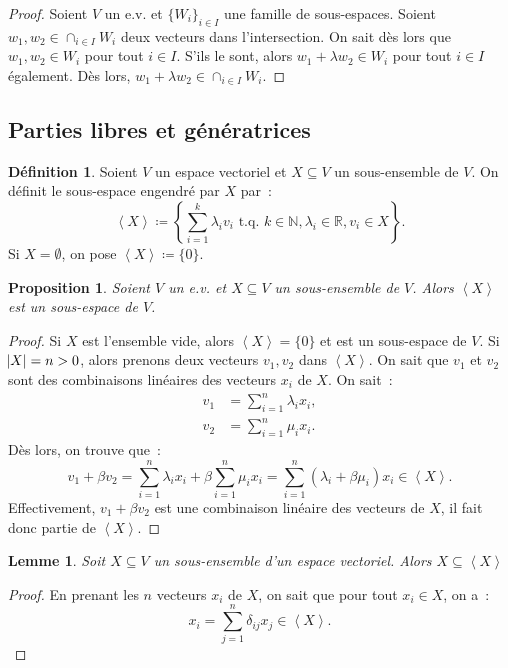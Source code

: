 \documentclass{article}
\newcommand{\N}{\mathbb N}
\newcommand{\R}{\mathbb R}
\newcommand{\eng}[1]{\left\langle#1\right\rangle}
\newcommand{\tq}{\textrm{ t.q. }}
\newtheorem{prp}[thm]{Proposition}
\newtheorem{lem}[thm]{Lemme}
\theoremstyle{definition}
\newtheorem{déf}[thm]{Définition}
\theoremstyle{remark}
\begin{document}
		\begin{proof} Soient $V$ un e.v. et $\{W_i\}_{i \in I}$ une famille de sous-espaces. Soient $w_1, w_2 \in \cap_{i \in I}W_i$ deux vecteurs dans l'intersection.
		On sait dès lors que $w_1, w_2 \in W_i$ pour tout $i \in I$. S'ils le sont, alors $w_1 + \lambda w_2 \in W_i$ pour tout $i \in I$ également. Dès lors,
		$w_1 + \lambda w_2 \in \cap_{i \in I}W_i$. \end{proof}

	\subsection{Parties libres et génératrices}
		\begin{déf} Soient $V$ un espace vectoriel et $X \subseteq V$ un sous-ensemble de $V$. On définit le sous-espace engendré par $X$ par~:
		\[\eng X \coloneqq \left\{\sum_{i=1}^k\lambda_iv_i \tq k \in \N, \lambda_i \in \R, v_i \in X\right\}.\] Si $X = \emptyset$, on pose $\eng X \coloneqq \{0\}$.
		\end{déf}

		\begin{prp} Soient $V$ un e.v. et $X \subseteq V$ un sous-ensemble de $V$. Alors $\eng X$ est un sous-espace de $V$. \end{prp}

		\begin{proof} Si $X$ est l'ensemble vide, alors $\eng X = \{0\}$ et est un sous-espace de $V$. Si $\abs X = n > 0$, alors prenons deux vecteurs $v_1, v_2$ dans
		$\eng X$. On sait que $v_1$ et $v_2$ sont des combinaisons linéaires des vecteurs $x_i$ de $X$. On sait~:
		\begin{align*}
			v_1 &= \sum_{i=1}^n\lambda_ix_i, \\
			v_2 &= \sum_{i=1}^n\mu_ix_i.
		\end{align*}
		Dès lors, on trouve que~: \[v_1 + \beta v_2 = \sum_{i=1}^n\lambda_ix_i + \beta\sum_{i=1}^n\mu_ix_i = \sum_{i=1}^n(\lambda_i + \beta\mu_i)x_i \in \eng X.\]
		Effectivement, $v_1 + \beta v_2$ est une combinaison linéaire des vecteurs de $X$, il fait donc partie de $\eng X$. \end{proof}

		\begin{lem}\label{X<<X>} Soit $X \subseteq V$ un sous-ensemble d'un espace vectoriel. Alors $X \subseteq \eng X$ \end{lem}

		\begin{proof} En prenant les $n$ vecteurs $x_i$ de $X$, on sait que pour tout $x_i \in X$, on a~:\[x_i = \sum_{j=1}^n\delta_{ij}x_j \in \eng X.\] \end{proof}
\end{document}
